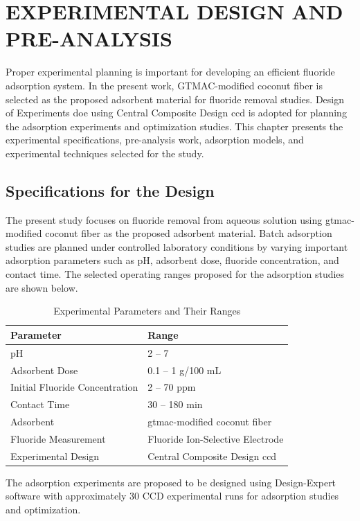 \chapter{EXPERIMENTAL DESIGN AND PRE-ANALYSIS}

Proper experimental planning is important for developing an efficient fluoride adsorption system. In the present work, GTMAC-modified coconut fiber is selected as the proposed adsorbent material for fluoride removal studies. Design of Experiments \gls{doe} using Central Composite Design \gls{ccd} is adopted for planning the adsorption experiments and optimization studies. This chapter presents the experimental specifications, pre-analysis work, adsorption models, and experimental techniques selected for the study.  
\section{Specifications for the Design}
The present study focuses on fluoride removal from aqueous solution using \gls{gtmac}-modified coconut fiber as the proposed adsorbent material. Batch adsorption studies are planned under controlled laboratory conditions by varying important adsorption parameters such as pH, adsorbent dose, fluoride concentration, and contact time. 
The selected operating ranges proposed for the adsorption studies are shown below. 
\begin{table}[h]
	\centering
	\caption{Experimental Parameters and Their Ranges}
	\label{tab:parameters}
	\begin{tabular}{|l|l|}
		\hline
		\textbf{Parameter} & \textbf{Range} \\
		\hline
		pH & 2 -- 7 \\
		Adsorbent Dose & 0.1 -- 1 g/100 mL \\
		Initial Fluoride Concentration & 2 -- 70 ppm \\
		Contact Time & 30 -- 180 min \\
		Adsorbent &\gls{gtmac}-modified coconut fiber \\
		Fluoride Measurement & Fluoride Ion-Selective Electrode \\
		Experimental Design & Central Composite Design \gls{ccd} \\
		\hline
	\end{tabular}
\end{table}

The adsorption experiments are proposed to be designed using Design-Expert software with approximately 30 CCD experimental runs for adsorption studies and optimization.

